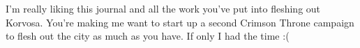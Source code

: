 I'm really liking this journal and all the work you've put into fleshing out Korvosa. You're making me want to start up a second Crimson Throne campaign to flesh out the city as much as you have. If only I had the time :(\\

